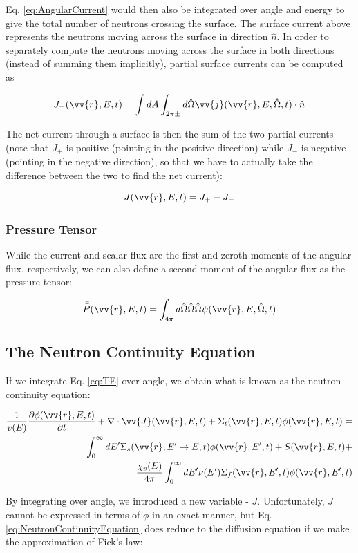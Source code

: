 \documentclass[10pt]{article}
\newcommand{\beq}{\begin{equation}}
\newcommand{\eeq}{\end{equation}}
\newcommand{\beqa}{\begin{equation}\begin{aligned}}
\newcommand{\eeqa}{\end{aligned}\end{equation}}
\newcommand{\hO}{\hat{\Omega}}
\newcommand{\spa}{(\vv{r}, E, \hO, t)}
\newcommand{\spas}{(\vv{r},E,t)}
\begin{document}
\begin{flushleft}
Eq. \ref{eq:AngularCurrent} would then also be integrated over angle and energy to give the total number of neutrons crossing the surface. The surface current above represents the neutrons moving across the surface in direction \(\hat{n}\). In order to separately compute the neutrons moving across the surface in both directions (instead of summing them implicitly), partial surface currents can be computed as

\beq
\label{eq:PartialCurrent}
J_\pm \spas = \int dA\int_{2\pi\pm}^{} d\hO   \vv{j}\spa \cdot\hat{n}
\eeq

The net current through a surface is then the sum of the two partial currents (note that \(J_+\) is positive (pointing in the positive direction) while \(J_-\) is negative (pointing in the negative direction), so that we have to actually take the difference between the two to find the net current):

\beq
\label{eq:TotalCurrent}
J \spas = J_+ - J_-
\eeq

\subsubsection{Pressure Tensor}

While the current and scalar flux are the first and zeroth moments of the angular flux, respectively, we can also define a second moment of the angular flux as the pressure tensor:

\beq
\label{eq:PressureTensor}
\bar{\bar{P}}(\vv{r},E,t)=\int_{4\pi}^{}d\hO  \hO  \hO  \psi\spa 
\eeq

\clearpage


\subsection{The Neutron Continuity Equation}
If we integrate Eq. \ref{eq:TE} over angle, we obtain what is known as the neutron continuity equation:

\beqa
\label{eq:NeutronContinuityEquation}
\frac{1}{v(E)} \frac{\partial\phi\spas}{\partial t} +
 \nabla\cdot \vv{J}\spas + 
 \Sigma_t\spas\phi\spas = \\
 \int_{0}^{\infty}dE' \Sigma_s(\vv{r}, E'\rightarrow E,t)\phi(\vv{r}, E', t) + S\spas+\\
 \frac{\chi_p(E)}{4\pi} \int_{0}^{\infty} dE'\nu(E')\Sigma_f(\vv{r}, E',t)\phi(\vv{r}, E',t)
\eeqa

By integrating over angle, we introduced a new variable - \(J\). Unfortunately, \(J\) cannot be expressed in terms of \(\phi\) in an exact manner, but Eq. \ref{eq:NeutronContinuityEquation} does reduce to the diffusion equation if we make the approximation of Fick's law:


\end{flushleft}
\end{document}
